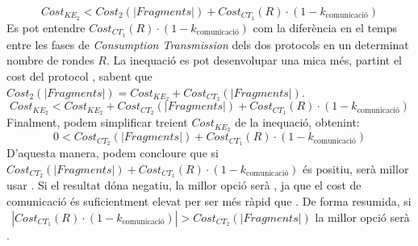\[Cost_{KE_2} <  Cost_{2}(|Fragments|) + Cost_{CT_1}(R) \cdot (1 - k_{\textrm{comunicació}})\]
Es pot entendre $Cost_{CT_1}(R) \cdot (1 - k_{\textrm{comunicació}})$ com la diferència en el temps entre les fases de \textit{Consumption Transmission} dels dos protocols en un determinat nombre de rondes $R$. La inequació es pot desenvolupar una mica més, partint el cost del protocol \cite{busom}, sabent que
$Cost_{2}(|Fragments|) = Cost_{KE_2} + Cost_{CT_2}(|Fragments|)$.
\[Cost_{KE_2} <  Cost_{KE_2} + Cost_{CT_2}(|Fragments|) + Cost_{CT_1}(R) \cdot (1 - k_{\textrm{comunicació}})\]
Finalment, podem simplificar treient $Cost_{KE_2}$ de la inequació, obtenint:
\[0 < Cost_{CT_2}(|Fragments|) + Cost_{CT_1}(R) \cdot (1 - k_{\textrm{comunicació}})\]
D'aquesta manera, podem concloure que si $Cost_{CT_2}(|Fragments|) + Cost_{CT_1}(R) \cdot (1 - k_{\textrm{comunicació}})$ és positiu, serà millor usar \cite{ busom}. Si el resultat dóna negatiu, la millor opció serà \cite{recsi}, ja que el cost de comunicació és suficientment elevat per ser més ràpid que \cite{busom}.  De forma resumida, si $\ \ |Cost_{CT_1}(R) \cdot (1 - k_{\textrm{comunicació}})| > Cost_{CT_2}(|Fragments|)$ la millor opció serà \cite{recsi}.
